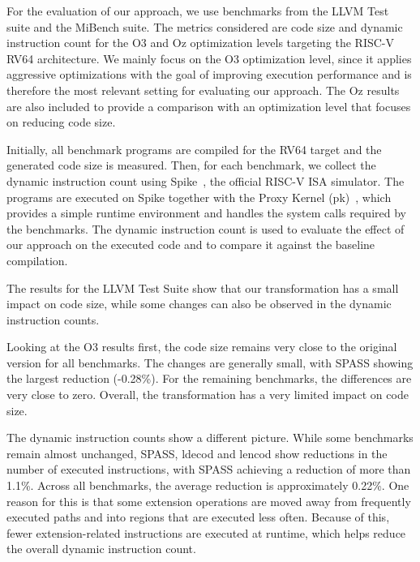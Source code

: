 
For the evaluation of our approach, we use benchmarks from the LLVM Test suite and the MiBench suite. The metrics considered are code size and dynamic instruction count for the O3 and Oz optimization levels targeting the RISC-V RV64 architecture. We mainly focus on the O3 optimization level, since it applies aggressive optimizations with the goal of improving execution performance and is therefore the most relevant setting for evaluating our approach. The Oz results are also included to provide a comparison with an optimization level that focuses on reducing code size.

Initially, all benchmark programs are compiled for the RV64 target and the generated code size is measured. Then, for each benchmark, we collect the dynamic instruction count using Spike~\cite{spike-chipyard,spike-github}, the official RISC-V ISA simulator. The programs are executed on Spike together with the Proxy Kernel (pk)~\cite{riscv-pk-github}, which provides a simple runtime environment and handles the system calls required by the benchmarks. The dynamic instruction count is used to evaluate the effect of our approach on the executed code and to compare it against the baseline compilation.







The results for the LLVM Test Suite show that our transformation has a small impact on code size, while some changes can also be observed in the dynamic instruction counts.

Looking at the O3 results first, the code size remains very close to the original version for all benchmarks. The changes are generally small, with SPASS showing the largest reduction (-0.28\%). For the remaining benchmarks, the differences are very close to zero. Overall, the transformation has a very limited impact on code size.

The dynamic instruction counts show a different picture. While some benchmarks remain almost unchanged, SPASS, ldecod and lencod show reductions in the number of executed instructions, with SPASS achieving a reduction of more than 1.1\%. Across all benchmarks, the average reduction is approximately 0.22\%. One reason for this is that some extension operations are moved away from frequently executed paths and into regions that are executed less often. Because of this, fewer extension-related instructions are executed at runtime, which helps reduce the overall dynamic instruction count.

